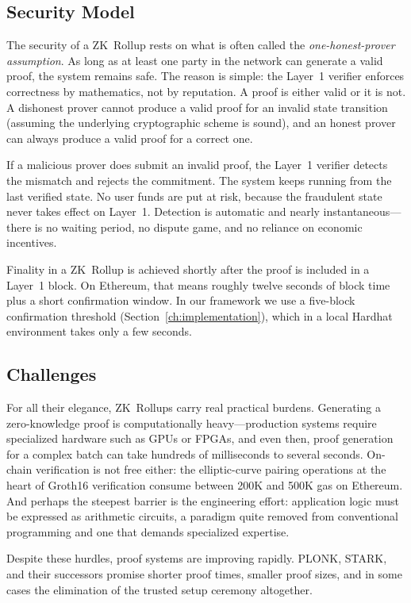 \documentclass[
]{elteikthesis}[2024/04/26]
\begin{document}
\subsection{Security Model}

The security of a ZK~Rollup rests on what is often called the \textit{one-honest-prover assumption}. As long as at least one party in the network can generate a valid proof, the system remains safe. The reason is simple: the Layer~1 verifier enforces correctness by mathematics, not by reputation. A proof is either valid or it is not. A dishonest prover cannot produce a valid proof for an invalid state transition (assuming the underlying cryptographic scheme is sound), and an honest prover can always produce a valid proof for a correct one.

If a malicious prover does submit an invalid proof, the Layer~1 verifier detects the mismatch and rejects the commitment. The system keeps running from the last verified state. No user funds are put at risk, because the fraudulent state never takes effect on Layer~1. Detection is automatic and nearly instantaneous---there is no waiting period, no dispute game, and no reliance on economic incentives.

Finality in a ZK~Rollup is achieved shortly after the proof is included in a Layer~1 block. On Ethereum, that means roughly twelve seconds of block time plus a short confirmation window. In our framework we use a five-block confirmation threshold (Section~\ref{ch:implementation}), which in a local Hardhat environment takes only a few seconds.

\subsection{Challenges}

For all their elegance, ZK~Rollups carry real practical burdens. Generating a zero-knowledge proof is computationally heavy---production systems require specialized hardware such as GPUs or FPGAs, and even then, proof generation for a complex batch can take hundreds of milliseconds to several seconds. On-chain verification is not free either: the elliptic-curve pairing operations at the heart of Groth16 verification consume between 200K and 500K gas on Ethereum. And perhaps the steepest barrier is the engineering effort: application logic must be expressed as arithmetic circuits, a paradigm quite removed from conventional programming and one that demands specialized expertise.

Despite these hurdles, proof systems are improving rapidly. PLONK, STARK, and their successors promise shorter proof times, smaller proof sizes, and in some cases the elimination of the trusted setup ceremony altogether.
\end{document}
